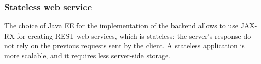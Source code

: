 \documentclass[../main.tex]{subfiles}
\begin{document}
\subsubsection{Stateless web service}
The choice of Java EE for the implementation of the backend allows to use JAX-RX for creating REST web services, which is stateless: the server's response do not rely on the previous requests sent by the client. A stateless application is more scalable, and it requires less server-side storage. 
\end{document}
